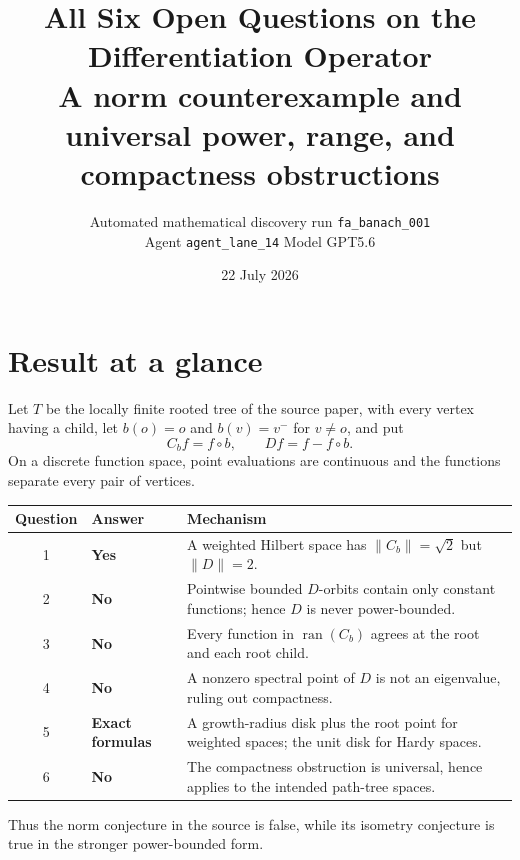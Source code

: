 \documentclass[11pt]{article}
\title{All Six Open Questions on the Differentiation Operator\\
\large A norm counterexample and universal power, range, and compactness obstructions}
\author{Automated mathematical discovery run \texttt{fa\_banach\_001}\\
Agent \texttt{agent\_lane\_14} \quad Model GPT5.6}
\date{22 July 2026}
\newcommand{\Cb}{C_b}
\newcommand{\ran}{\operatorname{ran}}
\begin{document}
\maketitle

\begin{center}
\end{center}

\section{Result at a glance}

Let $T$ be the locally finite rooted tree of the source paper, with every
vertex having a child, let $b(o)=o$ and $b(v)=v^-$ for $v\ne o$, and put
\[
  \Cb f=f\circ b,\qquad Df=f-f\circ b.
\]
On a discrete function space, point evaluations are continuous and the
functions separate every pair of vertices.

\begin{center}
\begin{tabularx}{0.96\textwidth}{@{}c>{\bfseries}lX@{}}
\toprule
Question & Answer & Mechanism \\
\midrule
1 & Yes & A weighted Hilbert space has $\|\Cb\|=\sqrt2$ but $\|D\|=2$. \\
2 & No & Pointwise bounded $D$-orbits contain only constant functions; hence $D$ is never power-bounded. \\
3 & No & Every function in $\ran(\Cb)$ agrees at the root and each root child. \\
4 & No & A nonzero spectral point of $D$ is not an eigenvalue, ruling out compactness. \\
5 & Exact formulas & A growth-radius disk plus the root point for weighted spaces; the unit disk for Hardy spaces. \\
6 & No & The compactness obstruction is universal, hence applies to the intended path-tree spaces. \\
\bottomrule
\end{tabularx}
\end{center}

Thus the norm conjecture in the source is false, while its isometry conjecture
is true in the stronger power-bounded form.
\end{document}
